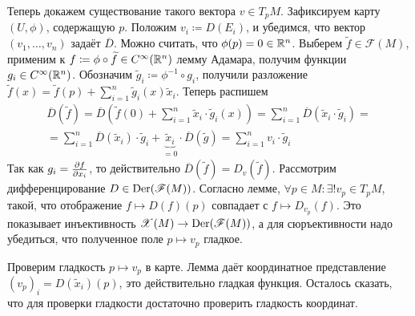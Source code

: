 \documentclass[a4paper]{report}
\begin{document}
{{{        Теперь докажем существование такого вектора $v \in T_p M$.
         Зафиксируем карту $(U, \phi)$, содержащую $p$.
         Положим $v_i \coloneqq D(E_i)$, и убедимся, что вектор $(v_1, \dots, v_n)$ задаёт $\overline{D}$.
        Можно считать, что $\phi(p) = 0 \in \mathbb{R}^n$.
        Выберем $\tilde{f} \in \mathscr{F}(M)$, применим к $f \coloneqq \phi \circ \widetilde{f} \in C^{\infty}(\mathbb{R}^n)$ лемму Адамара, получим функции $g_i \in C^{\infty}(\mathbb{R}^n)$.
         Обозначим $\tilde{g}_i \coloneqq \phi^{-1} \circ g_i$, получили разложение $\tilde{f}(x) = \tilde{f}(p) + \sum\limits_{i = 1}^{n}\tilde{g}_i(x)\tilde{x}_i$.
         Теперь распишем \begin{multline*}\overline{D}\left(\tilde{f}\right) = \overline{D}\left(\tilde{f}(0) + \sum\limits_{i=1}^{n}\tilde{x}_i \cdot \tilde{g}_i(x)\right) = \sum\limits_{i=1}^{n}\overline{D}\left(\tilde{x}_i \cdot \tilde{g}_i\right) =\\= \sum\limits_{i=1}^{n}\overline{D}\left(\tilde{x}_i\right) \cdot \tilde{g}_i + \underbrace{\tilde{x}_i}_{=0} \cdot \overline{D}\left(\tilde{g}\right) = \sum\limits_{i = 1}^{n} v_i \cdot \tilde{g}_i\end{multline*}
     Так как $g_i = \frac{\partial f}{\partial x_i}$, то действительно $\overline{D}(\tilde{f}) = D_v(\tilde{f})$.
        }
    Рассмотрим дифференцирование $D \in \operatorname{Der}(\mathscr{F}(M))$.
        Согласно лемме, $\forall p \in M: \exists !v_p \in T_p M$, такой, что отображение $f \mapsto D(f)(p)$ совпадает с $f \mapsto D_{v_p}(f)$.
    Это показывает инъективность $\mathscr{X}(M) \rightarrow \operatorname{Der}(\mathscr{F}(M))$, а для сюръективности надо убедиться, что полученное поле $p \mapsto v_p$ гладкое.

    Проверим гладкость $p \mapsto v_p$ в карте.
        Лемма даёт координатное представление $(v_p)_i = D(\tilde{x}_i)(p)$, это действительно гладкая функция.
    Осталось сказать, что для проверки гладкости достаточно проверить гладкость координат.
    }
    }
\end{document}
